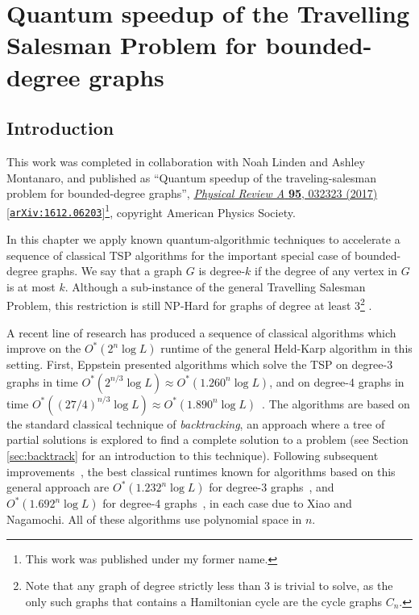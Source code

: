 \chapter{Quantum speedup of the Travelling Salesman Problem for bounded-degree graphs}
\label{chp:tsp}

\section{Introduction}

This work was completed in collaboration with Noah Linden and Ashley Montanaro, and published as ``Quantum speedup of the traveling-salesman problem for bounded-degree graphs'', \href{https://link.aps.org/doi/10.1103/PhysRevA.95.032323}{\textit{Physical Review A} \textbf{95}, 032323 (2017)} [{\tt \href{https://arxiv.org/abs/1612.06203}{arXiv:1612.06203}}]\footnote{This work was published under my former name.}, copyright American Physics Society.

In this chapter we apply known quantum-algorithmic techniques to accelerate a sequence of classical TSP algorithms for the important special case of bounded-degree graphs. We say that a graph $G$ is degree-$k$ if the degree of any vertex in $G$ is at most $k$. Although a sub-instance of the general Travelling Salesman Problem, this restriction is still NP-Hard for graphs of degree at least 3\footnote{Note that any graph of degree strictly less than 3 is trivial to solve, as the only such graphs that contains a Hamiltonian cycle are the cycle graphs $C_n$.} \cite{akiyama1980}.

A recent line of research has produced a sequence of classical algorithms which improve on the $O^*(2^n\log L)$ runtime of the general Held-Karp algorithm in this setting. First, Eppstein presented algorithms which solve the TSP on degree-3 graphs in time $O^*(2^{n/3}\log L) \approx O^*(1.260^n\log L)$, and on degree-4 graphs in time $O^*((27/4)^{n/3}\log L) \approx O^*(1.890^n\log L)$~\cite{eppstein2007}. The algorithms are based on the standard classical technique of {\em backtracking}, an approach where a tree of partial solutions is explored to find a complete solution to a problem (see Section \ref{sec:backtrack} for an introduction to this technique). Following subsequent improvements~\cite{iwama2007,liskiewicz14}, the best classical runtimes known for algorithms based on this general approach are $O^*(1.232^n\log L)$ for degree-3 graphs~\cite{xiao2016degree3}, and $O^*(1.692^n\log L)$ for degree-4 graphs~\cite{xiao2016degree4}, in each case due to Xiao and Nagamochi. All of these algorithms use polynomial space in $n$.

